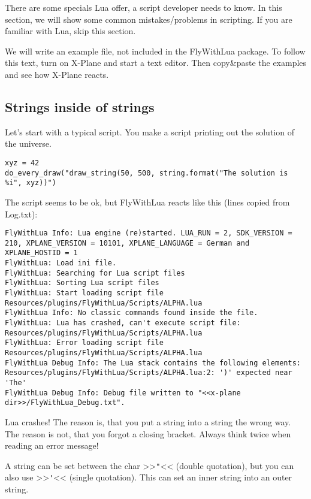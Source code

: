 \documentclass[11pt,parskip=half,a4paper]{scrartcl}
\begin{document}
There are some specials Lua offer, a script developer needs to know. In this section, we will show some common mistakes/problems in scripting. If you are familiar with Lua, skip this section.

We will write an example file, not included in the FlyWithLua package. To follow this text, turn on X-Plane and start a text editor. Then copy\&paste the examples and see how X-Plane reacts.

\subsection{Strings inside of strings}

Let's start with a typical script. You make a script printing out the solution of the universe.

\begin{lstlisting}
xyz = 42
do_every_draw("draw_string(50, 500, string.format("The solution is %i", xyz))")
\end{lstlisting}

The script seems to be ok, but FlyWithLua reacts like this (lines copied from Log.txt):

\begin{lstlisting}[firstnumber=1136]
FlyWithLua Info: Lua engine (re)started. LUA_RUN = 2, SDK_VERSION = 210, XPLANE_VERSION = 10101, XPLANE_LANGUAGE = German and XPLANE_HOSTID = 1
FlyWithLua: Load ini file.
FlyWithLua: Searching for Lua script files
FlyWithLua: Sorting Lua script files
FlyWithLua: Start loading script file Resources/plugins/FlyWithLua/Scripts/ALPHA.lua
FlyWithLua Info: No classic commands found inside the file.
FlyWithLua: Lua has crashed, can't execute script file: Resources/plugins/FlyWithLua/Scripts/ALPHA.lua
FlyWithLua: Error loading script file Resources/plugins/FlyWithLua/Scripts/ALPHA.lua
FlyWithLua Debug Info: The Lua stack contains the following elements:
Resources/plugins/FlyWithLua/Scripts/ALPHA.lua:2: ')' expected near 'The'
FlyWithLua Debug Info: Debug file written to "<<x-plane dir>>/FlyWithLua_Debug.txt".
\end{lstlisting}

Lua crashes! The reason is, that you put a string into a string the wrong way. The reason is not, that you forgot a closing bracket. Always think twice when reading an error message!

A string can be set between the char >>\verb|"|<< (double quotation), but you can also use >>\verb|'|<< (single quotation). This can set an inner string into an outer string.
\end{document}

